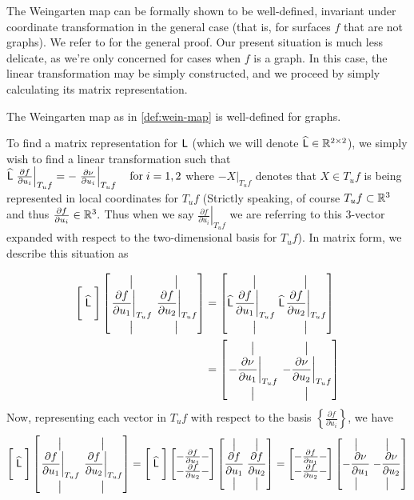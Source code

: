 	The Weingarten map can be formally shown to be well-defined, invariant under coordinate transformation in the general case (that is, for surfaces $f$ that are not graphs). We refer to \autocite{Kuhnel-DiffGeo} for the general proof. Our present situation is much less delicate, as we're only concerned for cases when $f$ is a graph. In this case, the linear transformation may be simply constructed, and we proceed by simply calculating its matrix representation.	
	\begin{lemma}
		The Weingarten map as in \cref{def:wein-map} is well-defined for graphs.
	\end{lemma}
	To find a matrix representation for $\mathsf{L}$ (which we will denote $\widehat{\mathsf{L}} \in \mathbb{R}^{2\times2}$), we simply wish to find a linear transformation
	such that
	$\widehat{\mathsf{L}} \left.\frac{\partial f}{\partial u_i}\right|_{T_u f}
		= - \left.\frac{\partial \nu}{\partial u_i}\right|_{T_u f} \quad \textrm{for} \; i=1,2$
			where $- \left.X\right|_{T_u f}$ denotes that $X \in T_u f$ is being represented in 
	local coordinates for $T_u f$ (Strictly speaking, of course $T_u f \subset \mathbb{R}^3$ and thus
	$\frac{\partial f}{\partial u_i} \in \mathbb{R}^3.$ Thus when we say $ \left.\frac{\partial f}{\partial u_i}\right|_{T_u f}$ we are referring to this 3-vector expanded with respect to the two-dimensional basis for $T_u f$). In matrix form, we describe this situation as
	
	\begin{align}
	\Bigg[ \;\widehat{\mathsf{L}}\; \Bigg]
	\left[ \overset{\big\vert}{\underset{\big\vert}{\left.\frac{\partial f}{\partial u_1}\right|_{T_u f}}} \;
			\overset{\big\vert}{\underset{\big\vert}{\left.\frac{\partial f}{\partial u_2}\right|_{T_u f}}} \right]
			&= \left[ \widehat{\mathsf{L}} \overset{\big\vert}{\underset{\big\vert}{\left.\frac{\partial f}{\partial u_1}\right|_{T_u f}}} \;
			\widehat{\mathsf{L}} \overset{\big\vert}{\underset{\big\vert}{\left.\frac{\partial f}{\partial u_2}\right|_{T_u f}}} \right] \\
			&= \left[ \overset{\big\vert}{\underset{\big\vert}{ \left.-\frac{\partial \nu}{\partial u_1}\right|_{T_u f}}} \;
			\overset{\big\vert}{\underset{\big\vert}{\left.-\frac{\partial \nu}{\partial u_2}\right|_{T_u f}}} \right]
			\end{align}
			Now, representing each vector in  $T_u f$ with respect to the basis $\left\{ \frac{\partial f}{\partial u_i}\right\}$, we have
  \begin{align}
      	\Bigg[ \;\widehat{\mathsf{L}}\; \Bigg]
      \left[ \overset{\big\vert}{\underset{\big\vert}{\left.\frac{\partial f}{\partial u_1}\right|_{T_u f}}} \;
      \overset{\big\vert}{\underset{\big\vert}{\left.\frac{\partial f}{\partial u_2}\right|_{T_u f}}} \right]
      = 
			\Bigg[ \;\widehat{\mathsf{L}}\; \Bigg]
			\begin{bmatrix} - \frac{\partial f}{\partial u_1} - \\
				- \frac{\partial f}{\partial u_2} -
							\end{bmatrix}
			\left[ \overset{\big\vert}{\underset{\big\vert}{\frac{\partial f}{\partial u_1}}} \;
				\overset{\big\vert}{\underset{\big\vert}{\frac{\partial f}{\partial u_2}}}\right]
				= \begin{bmatrix} - \frac{\partial f}{\partial u_1} - \\
				- \frac{\partial f}{\partial u_2} -
				\end{bmatrix}
				\left[ \overset{\big\vert}{\underset{\big\vert}{-\frac{\partial \nu}{\partial u_1}}} \;
				\overset{\big\vert}{\underset{\big\vert}{-\frac{\partial \nu}{\partial u_2}}}\right] \\
	\end{align}
		 
